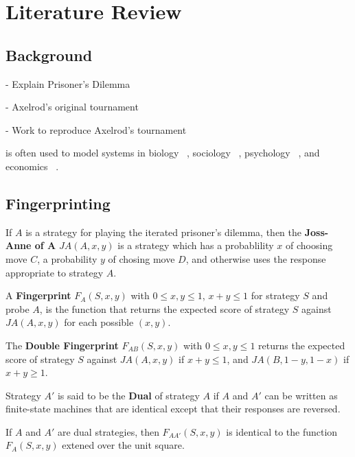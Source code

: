 
\chapter{Literature Review}\label{cha:literature_review}

\section{Background}

- Explain Prisoner's Dilemma

- Axelrod's original tournament

- Work to reproduce Axelrod's tournament ~\cite{Knight2016}



is often used to model systems in biology ~\cite{Sigmund1999}, sociology ~\cite{Franken2005},
psychology ~\cite{Ishibuchi2005}, and economics ~\cite{Chong2005}.


\section{Fingerprinting}\label{sec:fingerprinting}

\begin{definition}\label{def:joss-ann}
If $A$ is a strategy for playing the iterated prisoner's dilemma, then the \textbf{Joss-Anne of A} $JA(A, x, y)$ is a strategy which has a probablility $x$ of choosing move $C$, a probability $y$ of chosing move $D$, and otherwise uses the response appropriate to strategy $A$.
\end{definition}

\begin{definition}\label{def:fingerprint}
A \textbf{Fingerprint} $F_A(S, x, y)$ with $0 \leq x, y \leq 1$, $x+y \leq 1$ for strategy $S$ and probe $A$, is the function that returns the expected score of strategy $S$ against $JA(A, x, y)$ for each possible $(x, y)$.
\end{definition}

\begin{definition}\label{def:double-fingerprint}
The \textbf{Double Fingerprint} $F_{AB}(S, x, y)$ with $0 \leq x, y \leq 1$ returns the expected score of strategy $S$ against $JA(A, x, y)$ if $x+y \leq 1$, and $JA(B, 1-y, 1-x)$ if $x+y \geq 1$.
\end{definition}

\begin{definition}\label{def:dual}
Strategy $A'$ is said to be the \textbf{Dual} of strategy $A$ if $A$ and $A'$ can be written as finite-state machines that are identical except that their responses are reversed.
\end{definition}

\begin{theorem}\label{fingerprint-unit-square}
If $A$ and $A'$ are dual strategies, then $F_{AA'}(S, x, y)$ is identical to the function $F_A(S, x, y)$ extened over the unit square.
\end{theorem}

